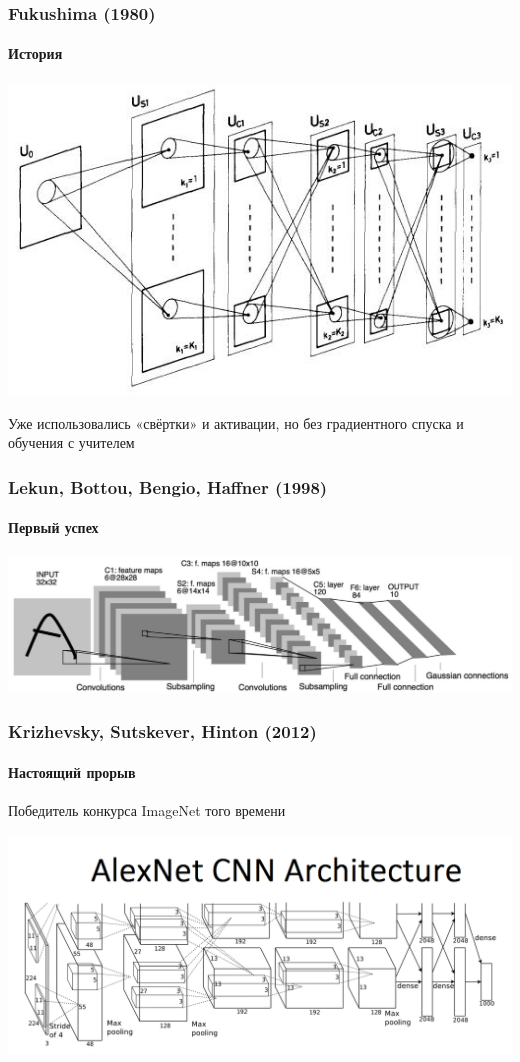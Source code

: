\documentclass[fullscreen=true, bookmarks=true, hyperref={pdfencoding=unicode}]{beamer}
\begin{document}
\begin{frame}
  \frametitle{Fukushima (1980)}
  \framesubtitle{История}
  \begin{center}
    \includegraphics[keepaspectratio,
                     height=0.5\paperheight]{Fukushima_1980.png}
  \end{center}
  Уже использовались «свёртки» и активации, но без градиентного спуска и обучения с учителем
\end{frame}


\begin{frame}
  \frametitle{Lekun, Bottou, Bengio, Haffner (1998)}
  \framesubtitle{Первый успех}
  \begin{center}
    \includegraphics[keepaspectratio,
                     height=0.33\paperheight]{LeNet.jpg}
  \end{center}
\end{frame}


\begin{frame}
  \frametitle{Krizhevsky, Sutskever, Hinton (2012)}
  \framesubtitle{Настоящий прорыв}
  Победитель конкурса ImageNet того времени
  \begin{center}
    \includegraphics[keepaspectratio,
                     height=0.5\paperheight]{AlexNetCNN.png}
  \end{center}
\end{frame}
\end{document}
